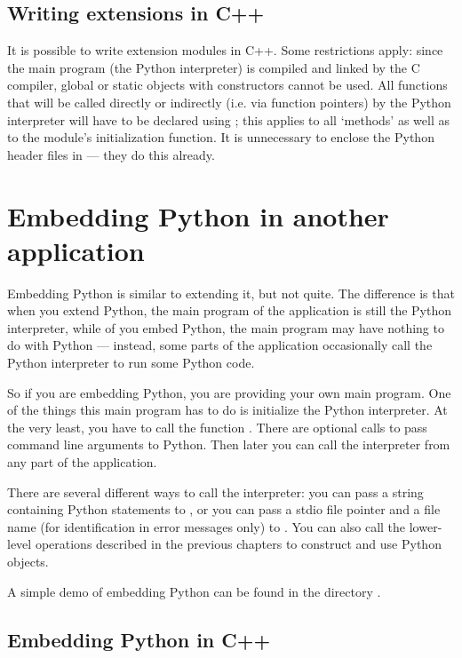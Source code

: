 \section{Writing extensions in C++}

It is possible to write extension modules in C++.  Some restrictions
apply: since the main program (the Python interpreter) is compiled and
linked by the C compiler, global or static objects with constructors
cannot be used.  All functions that will be called directly or
indirectly (i.e. via function pointers) by the Python interpreter will
have to be declared using ; this applies to all
`methods' as well as to the module's initialization function.
It is unnecessary to enclose the Python header files in
 --- they do this already.


\chapter{Embedding Python in another application}

Embedding Python is similar to extending it, but not quite.  The
difference is that when you extend Python, the main program of the
application is still the Python interpreter, while of you embed
Python, the main program may have nothing to do with Python ---
instead, some parts of the application occasionally call the Python
interpreter to run some Python code.

So if you are embedding Python, you are providing your own main
program.  One of the things this main program has to do is initialize
the Python interpreter.  At the very least, you have to call the
function .  There are optional calls to pass command
line arguments to Python.  Then later you can call the interpreter
from any part of the application.

There are several different ways to call the interpreter: you can pass
a string containing Python statements to , or you
can pass a stdio file pointer and a file name (for identification in
error messages only) to .  You can also call the
lower-level operations described in the previous chapters to construct
and use Python objects.

A simple demo of embedding Python can be found in the directory
.


\section{Embedding Python in C++}


